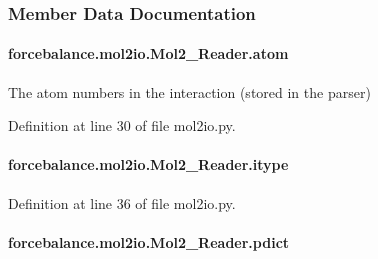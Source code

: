 \subsubsection{Member Data Documentation}
\hypertarget{classforcebalance_1_1mol2io_1_1Mol2__Reader_ab65a3dde9c3f2ba716089a52de4bf9fe}{
\paragraph[{atom}]{\setlength{\rightskip}{0pt plus 5cm}forcebalance.\-mol2io.\-Mol2\-\_\-\-Reader.\-atom}}\label{classforcebalance_1_1mol2io_1_1Mol2__Reader_ab65a3dde9c3f2ba716089a52de4bf9fe}


The atom numbers in the interaction (stored in the parser) 



Definition at line 30 of file mol2io.\-py.

\hypertarget{classforcebalance_1_1mol2io_1_1Mol2__Reader_a86efd5020943bd5cb52a9299e88a4fac}{
\paragraph[{itype}]{\setlength{\rightskip}{0pt plus 5cm}forcebalance.\-mol2io.\-Mol2\-\_\-\-Reader.\-itype}}\label{classforcebalance_1_1mol2io_1_1Mol2__Reader_a86efd5020943bd5cb52a9299e88a4fac}


Definition at line 36 of file mol2io.\-py.

\hypertarget{classforcebalance_1_1mol2io_1_1Mol2__Reader_a3d0014f83cdf754983feade05fa162e2}{
\paragraph[{pdict}]{\setlength{\rightskip}{0pt plus 5cm}forcebalance.\-mol2io.\-Mol2\-\_\-\-Reader.\-pdict}}\label{classforcebalance_1_1mol2io_1_1Mol2__Reader_a3d0014f83cdf754983feade05fa162e2}


